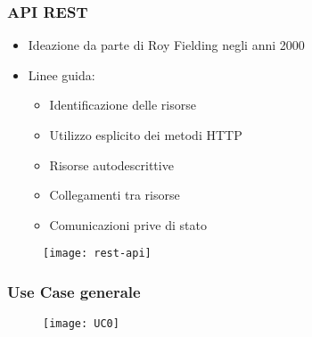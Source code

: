 \begin{frame}
  \frametitle{API REST}

  \begin{itemize}
  \item Ideazione da parte di Roy Fielding negli anni 2000
  \item Linee guida:
    \begin{itemize}
    \item Identificazione delle risorse
    \item Utilizzo esplicito dei metodi HTTP
    \item Risorse autodescrittive
    \item Collegamenti tra risorse
    \item Comunicazioni prive di stato
    \end{itemize}
  \end{itemize}

  \begin{figure}[H]
    \centering
    \texttt{[image: rest-api]}
  \end{figure}
\end{frame}

\begin{frame}

  \frametitle{Use Case generale}
  \begin{figure}[H]
    \centering
    \texttt{[image: UC0]}
  \end{figure}
\end{frame}

